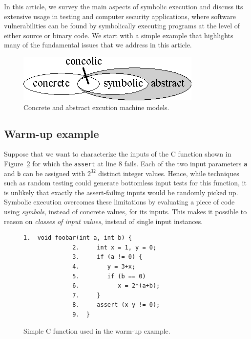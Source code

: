 In this article, we survey the main aspects of symbolic execution and discuss its extensive usage in testing and computer security applications, where software vulnerabilities can be found by symbolically executing programs at the level of either source or binary code. We start with a simple example that highlights many of the fundamental issues that we address in this article.

\begin{figure}[t]
\centering
\includegraphics[width=0.35\columnwidth]{images/concrete-abstract.eps} 
\caption{Concrete and abstract excution machine models.}
\label{fig:concrete-symbolic}
\end{figure}

\subsection{Warm-up example}
\label{symbolic-execution-example}

Suppose that we want to characterize the inputs of the C function shown in Figure~\ref{fig:example-1} for which the {\tt assert} at line 8 fails. Each of the two input parameters {\tt a} and {\tt b} can be assigned with $2^{32}$ distinct integer values. Hence, while techniques such as random testing could generate bottomless input tests for this function, it is unlikely that exactly the assert-failing inputs would be randomly picked up. 
Symbolic execution overcomes these limitations by evaluating a piece of code using {\em symbols}, instead of concrete values, for its inputs. This makes it possible to reason on {\em classes of input values}, instead of single input instances. 

\begin{figure}[t]
\begin{lstlisting}[basicstyle=\ttfamily\small]
              1.  void foobar(int a, int b) {
              2.     int x = 1, y = 0;
              3.     if (a != 0) {
              4.        y = 3+x;
              5.        if (b == 0)
              6.           x = 2*(a+b);
              7.     }
              8.     assert (x-y != 0);
              9.  }
\end{lstlisting}
\caption{Simple C function used in the warm-up example.}
\label{fig:example-1}
\end{figure}

